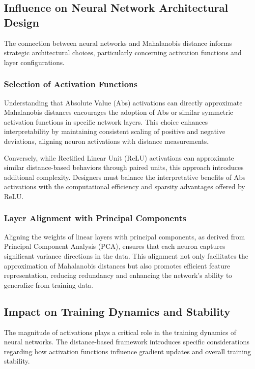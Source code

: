 \subsection{Influence on Neural Network Architectural Design}

The connection between neural networks and Mahalanobis distance informs strategic architectural choices, particularly concerning activation functions and layer configurations.

\subsubsection{Selection of Activation Functions}

Understanding that Absolute Value (Abs) activations can directly approximate Mahalanobis distances encourages the adoption of Abs or similar symmetric activation functions in specific network layers. This choice enhances interpretability by maintaining consistent scaling of positive and negative deviations, aligning neuron activations with distance measurements.

Conversely, while Rectified Linear Unit (ReLU) activations can approximate similar distance-based behaviors through paired units, this approach introduces additional complexity. Designers must balance the interpretative benefits of Abs activations with the computational efficiency and sparsity advantages offered by ReLU.

\subsubsection{Layer Alignment with Principal Components}

Aligning the weights of linear layers with principal components, as derived from Principal Component Analysis (PCA), ensures that each neuron captures significant variance directions in the data. This alignment not only facilitates the approximation of Mahalanobis distances but also promotes efficient feature representation, reducing redundancy and enhancing the network's ability to generalize from training data.

\subsection{Impact on Training Dynamics and Stability}

The magnitude of activations plays a critical role in the training dynamics of neural networks. The distance-based framework introduces specific considerations regarding how activation functions influence gradient updates and overall training stability.

